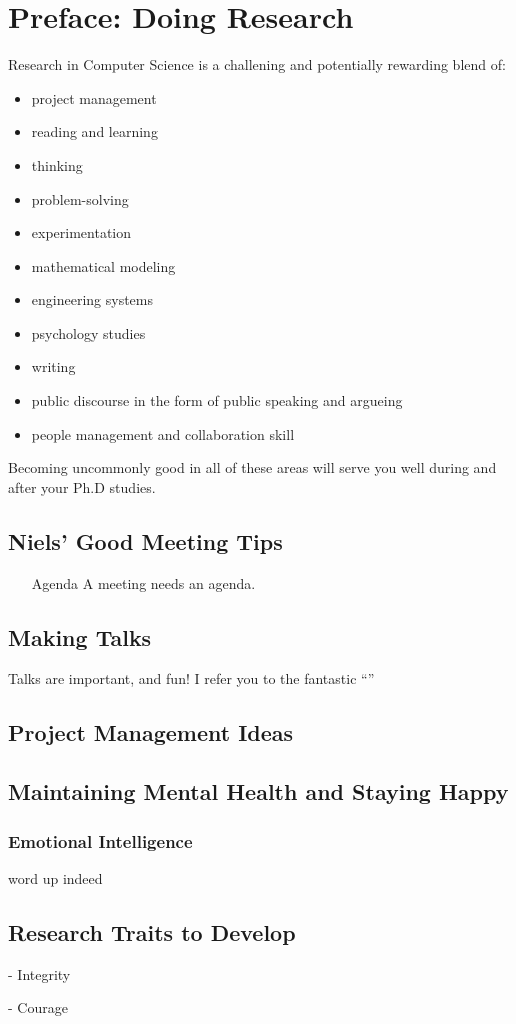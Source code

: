 \chapter{Preface: Doing Research}

Research in Computer Science is a challening and potentially rewarding blend of:
\begin{itemize}
\item project management
\item reading and learning
\item thinking
\item problem-solving
\item experimentation
\item mathematical modeling
\item engineering systems
\item psychology studies
\item writing
\item public discourse in the form of public speaking and argueing
\item people management and collaboration skill
\end{itemize}
Becoming uncommonly good in all of these areas will serve you well during and after your Ph.D studies.

\section{Niels' Good Meeting Tips}

\begin{itemize}

\item[Agenda] A meeting needs an agenda. 

\end{itemize}

\section{Making Talks}
Talks are important, and fun! I refer you to the fantastic ``''

\section{Project Management Ideas}

\section{Maintaining Mental Health and Staying Happy}


\subsection{Emotional Intelligence}

word up
indeed

\section{Research Traits to Develop}

- Integrity

- Courage
